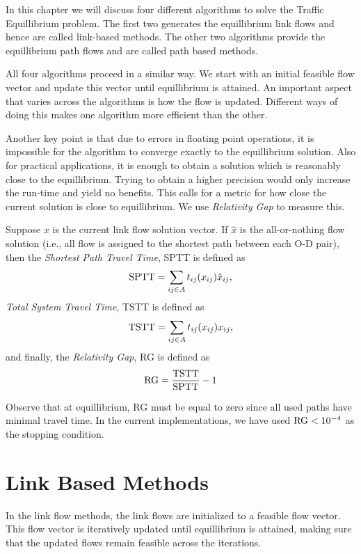 In this chapter we will discuss four different algorithms to solve
the Traffic Equillibrium problem. The first two generates
the equillibrium link flows and hence are called link-based
methods. The other two algorithms provide the equillibrium path
flows and are called path based methods.

All four algorithms proceed in a similar way. We start with
an initial feasible flow vector and update this vector until
equillibrium is attained. An important aspect that varies across
the algorithms is how the flow is updated. Different ways of
doing this makes one algorithm more efficient than the other.

Another key point is that due to errors in floating point operations,
it is impossible for the algorithm to converge exactly to the
equillibrium solution. Also for practical applications, it is
enough to obtain a solution which is reasonably close to the
equillibrium. Trying to obtain a higher precision would only
increase the run-time and yield no benefits.
This calls for a metric for how close the current solution is
close to equillibrium. We use \emph{Relativity Gap} to measure this.

\begin{definition}
	Suppose $x$ is the current link flow solution vector. If $\hat{x}$
	is the all-or-nothing flow solution (i.e., all flow is
	assigned to the shortest path between each O-D pair), then
	the \emph{Shortest Path Travel Time}, SPTT is defined as
	\[
		\hbox{SPTT} = \sum_{ij\in A}t_{ij}(x_{ij})\hat{x}_{ij},
	\]
	\emph{Total System Travel Time}, TSTT is defined as
	\[
		\hbox{TSTT} = \sum_{ij\in A} t_{ij}(x_{ij})x_{ij},
	\]
	and finally, the \emph{Relativity Gap}, RG is defined as
	\[
		\hbox{RG} = \frac{\hbox{TSTT}}{\hbox{SPTT}}-1
	\]
\end{definition}

Observe that at equillibrium, RG must be equal to zero since all
used paths have minimal travel time. In the current implementations,
we have used $\hbox{RG}<10^{-4}$ as the stopping condition.


\section{Link Based Methods}
In the link flow methods, the link flows are
initialized to a feasible flow vector. This flow
vector is iteratively updated until equillibrium is attained,
making sure that the updated flows remain feasible
across the iterations.

